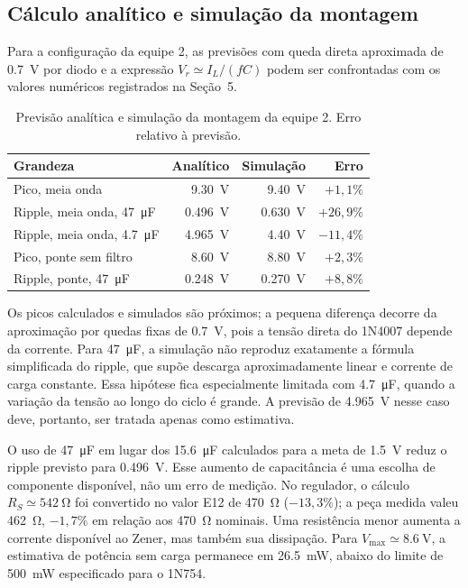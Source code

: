 \documentclass[11pt,a4paper]{article}
\begin{document}
\subsection{Cálculo analítico e simulação da montagem}

Para a configuração da equipe 2, as previsões com queda direta aproximada de \SI{0,7}{\volt} por diodo e a expressão \(V_r\simeq I_L/(fC)\) podem ser confrontadas com os valores numéricos registrados na Seção~5.

\begin{table}[H]
\centering
\small
\caption{Previsão analítica e simulação da montagem da equipe 2. Erro relativo à previsão.}
\label{tab:discussao_analitico_sim}
\begin{tabular}{@{}p{6.4cm}rrr@{}}
\toprule
\textbf{Grandeza} & \textbf{Analítico} & \textbf{Simulação} & \textbf{Erro} \\
\midrule
Pico, meia onda & \SI{9,30}{\volt} & \SI{9,40}{\volt} & \(+1,1\%\) \\
Ripple, meia onda, \SI{47}{\micro\farad} & \SI{0,496}{\volt} & \SI{0,630}{\volt} & \(+26,9\%\) \\
Ripple, meia onda, \SI{4,7}{\micro\farad} & \SI{4,965}{\volt} & \SI{4,40}{\volt} & \(-11,4\%\) \\
Pico, ponte sem filtro & \SI{8,60}{\volt} & \SI{8,80}{\volt} & \(+2,3\%\) \\
Ripple, ponte, \SI{47}{\micro\farad} & \SI{0,248}{\volt} & \SI{0,270}{\volt} & \(+8,8\%\) \\
\bottomrule
\end{tabular}
\end{table}

Os picos calculados e simulados são próximos; a pequena diferença decorre da aproximação por quedas fixas de \SI{0,7}{\volt}, pois a tensão direta do 1N4007 depende da corrente. Para \SI{47}{\micro\farad}, a simulação não reproduz exatamente a fórmula simplificada do ripple, que supõe descarga aproximadamente linear e corrente de carga constante. Essa hipótese fica especialmente limitada com \SI{4,7}{\micro\farad}, quando a variação da tensão ao longo do ciclo é grande. A previsão de \SI{4,965}{\volt} nesse caso deve, portanto, ser tratada apenas como estimativa.

O uso de \SI{47}{\micro\farad} em lugar dos \SI{15,6}{\micro\farad} calculados para a meta de \SI{1,5}{\volt} reduz o ripple previsto para \SI{0,496}{\volt}. Esse aumento de capacitância é uma escolha de componente disponível, não um erro de medição. No regulador, o cálculo \(R_S\simeq\SI{542}{\ohm}\) foi convertido no valor E12 de \SI{470}{\ohm} (\(-13,3\%\)); a peça medida valeu \SI{462}{\ohm}, \(-1,7\%\) em relação aos \SI{470}{\ohm} nominais. Uma resistência menor aumenta a corrente disponível ao Zener, mas também sua dissipação. Para \(V_{\max}\simeq\SI{8,6}{\volt}\), a estimativa de potência sem carga permanece em \SI{26,5}{\milli\watt}, abaixo do limite de \SI{500}{\milli\watt} especificado para o 1N754.
\end{document}
